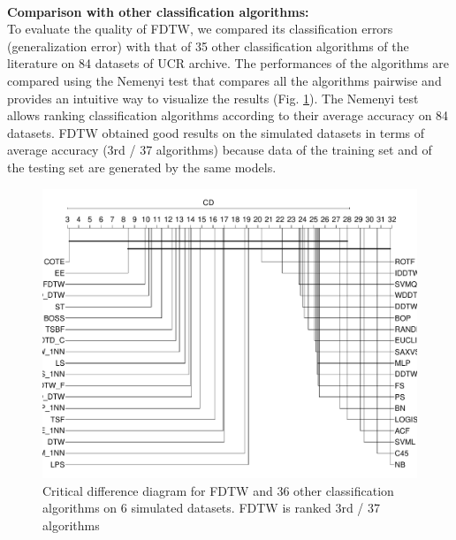  \paragraph{}\textbf{Comparison with other classification algorithms:}  \\
To evaluate the quality of FDTW, we compared its classification errors (generalization error) with that of 35 other classification algorithms \cite{bagnall2016great} of the literature on 84 datasets of UCR archive{{}}.
 The performances of the algorithms are compared using 
the Nemenyi test that compares all the algorithms pairwise and  provides an intuitive way to
visualize the results (Fig. \ref{cd2}). The Nemenyi test allows ranking  classification algorithms according to their average accuracy on 84 datasets.
 FDTW obtained good results on the simulated datasets in terms of average accuracy (3rd / 37 algorithms) because  data of the training set and of the testing set are generated by the same models.

\begin{figure}
\centering
\includegraphics[scale=0.33]{images/cd1}
\caption{Critical difference diagram for FDTW and $36$ other classification algorithms on 6 simulated datasets. FDTW is ranked 3rd / 37 algorithms}

\label{cd2}
\end{figure}



